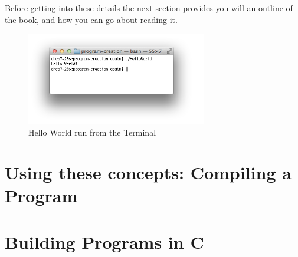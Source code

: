 Before getting into these details the next section provides you will an outline of the book, and how you can go about reading it.

\begin{figure}[b]
   \centering
   \includegraphics[width=0.7\textwidth]{./topics/programs-and-compilers/images/HelloWorld} 
   \caption{Hello World run from the Terminal}
   \label{fig:run-1-helloworld}
\end{figure}








% 







\clearpage
\section{Using these concepts: Compiling a Program} %
\label{sec:using_these_concepts_compiling_a_program}




\clearpage
\def\pageLang{c}
\section{Building Programs in C} %
\label{sec:building_programs_in_c}

